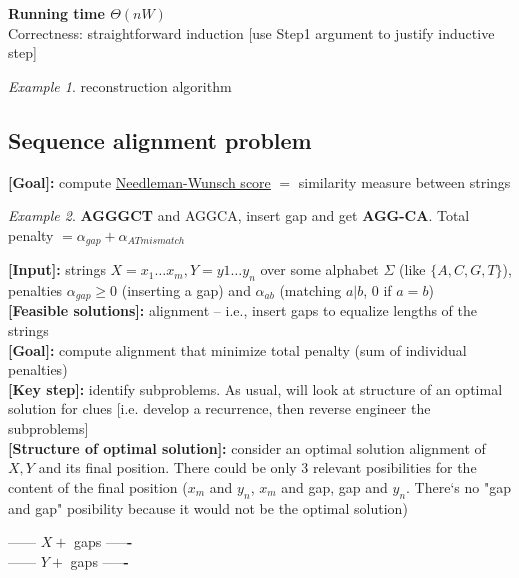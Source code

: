 \documentclass[a4paper,12pt]{article}
\theoremstyle{plain}
\theoremstyle{definition}
\theoremstyle{remark}
\newtheorem*{example}{Example}
\begin{document}
\textbf{Running time $\Theta(nW)$}
\\

Correctness: straightforward induction [use Step1 argument to justify inductive step]
\\

\begin{example}reconstruction algorithm\end{example}



\subsection{Sequence alignment problem}
\textbf{[Goal]:} compute \underline{Needleman-Wunsch score} $=$ similarity measure between strings

\begin{example} \textbf{AGGGCT} and AGGCA, insert gap and get \textbf{AGG-CA}. Total penalty $= \alpha_{gap} + \alpha_{AT mismatch}$\end{example}

\textbf{[Input]:} strings $X = x_1 \dots x_m, Y = y1 \dots y_n$ over some alphabet $\Sigma$ (like $\{A, C, G, T\}$), penalties $\alpha_{gap} \geq 0$ (inserting a gap) and $\alpha_{ab}$ (matching $a|b$, $0$ if $a=b$)
\\

\textbf{[Feasible solutions]:} alignment -- i.e., insert gaps to equalize lengths of the strings
\\

\textbf{[Goal]:} compute alignment that minimize total penalty (sum of individual penalties)
\\

\textbf{[Key step]:} identify subproblems. As usual, will look at structure of an optimal solution for clues [i.e. develop a recurrence, then reverse engineer the subproblems]
\\

\textbf{[Structure of optimal solution]:} consider an optimal solution alignment of $X, Y$ and its final position. There could be only 3 relevant posibilities for the content of the final position ($x_m$ and $y_n$, $x_m$ and gap, gap and $y_n$. There`s no "gap and gap" posibility because it would not be the optimal solution)\\
\begin{center}
------ $X +$ gaps -----\textbf{-}\\
------ $Y +$ gaps -----\textbf{-}\\
\end{center}
\end{document}
